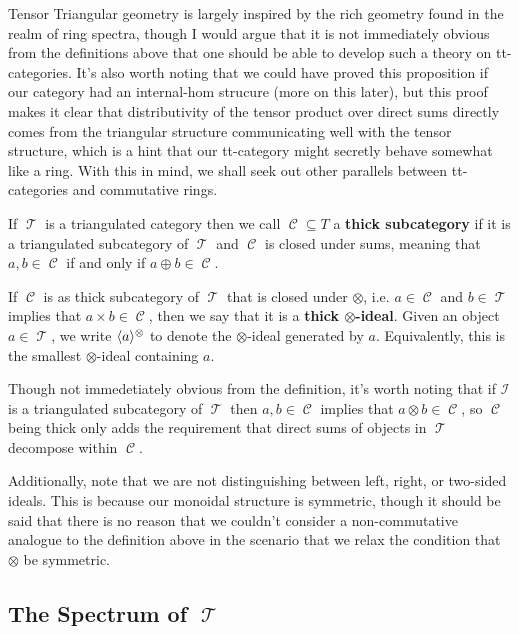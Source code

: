 \documentclass[11pt]{article}
\DeclareMathOperator{\CC}{\mathcal{C}}
\DeclareMathOperator{\TT}{\mathcal{T}}
\begin{document}
\begin{rmk}
Tensor Triangular geometry is largely inspired by the rich geometry found in the realm of ring spectra, though I would argue that it is not immediately obvious from the definitions above that one should be able to develop such a theory on tt-categories. It's also worth noting that we could have proved this proposition if our category had an internal-hom strucure (more on this later), but this proof makes it clear that distributivity of the tensor product over direct sums directly comes from the triangular structure communicating well with the tensor structure, which is a hint that our tt-category might secretly behave somewhat like a ring. With this in mind, we shall seek out other parallels between tt-categories and commutative rings.
\end{rmk}

\begin{defn}
If $\TT$ is a triangulated category then we call $\CC \subseteq T$ a \textbf{thick subcategory} if it is a triangulated subcategory of $\TT$ and $\CC$ is closed under sums, meaning that $a,b \in \CC$ if and only if $a \oplus b \in \CC$.

If $\CC$ is as thick subcategory of $\TT$ that is closed under $\otimes$, i.e. $a \in \CC$ and $b \in \TT$ implies that $a \times b \in \CC$, then we say that it is a \textbf{thick $\otimes$-ideal}. Given an object $a \in \TT$, we write $\langle a \rangle^\otimes$ to denote the $\otimes$-ideal generated by $a$. Equivalently, this is the smallest $\otimes$-ideal containing $a$.
\end{defn}

\begin{rmk}
Though not immedetiately obvious from the definition, it's worth noting that if $\mathcal{I}$ is a triangulated subcategory of $\TT$ then $a,b \in \CC$ implies that $a \otimes b \in \CC$, so $\CC$ being thick only adds the requirement that direct sums of objects in $\TT$ decompose within $\CC$.

Additionally, note that we are not distinguishing between left, right, or two-sided ideals. This is because our monoidal structure is symmetric, though it should be said that there is no reason that we couldn't consider a non-commutative analogue to the definition above in the scenario that we relax the condition that $\otimes$ be symmetric.
\end{rmk}

\subsection{The Spectrum of $\TT$}
\end{document}

